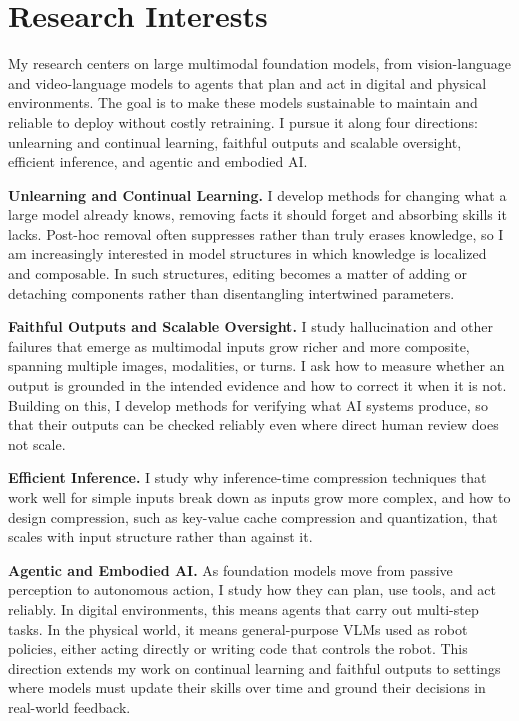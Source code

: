 \documentclass[letterpaper,11pt]{article}
\begin{document}
\section{Research Interests}

My research centers on large multimodal foundation models, from vision-language and video-language models to agents that plan and act in digital and physical environments. The goal is to make these models sustainable to maintain and reliable to deploy without costly retraining. I pursue it along four directions: unlearning and continual learning, faithful outputs and scalable oversight, efficient inference, and agentic and embodied AI.

\vspace{0.25cm}

\textbf{Unlearning and Continual Learning.}
I develop methods for changing what a large model already knows, removing facts it should forget and absorbing skills it lacks. Post-hoc removal often suppresses rather than truly erases knowledge, so I am increasingly interested in model structures in which knowledge is localized and composable. In such structures, editing becomes a matter of adding or detaching components rather than disentangling intertwined parameters.

\vspace{0.25cm}

\textbf{Faithful Outputs and Scalable Oversight.}
I study hallucination and other failures that emerge as multimodal inputs grow richer and more composite, spanning multiple images, modalities, or turns. I ask how to measure whether an output is grounded in the intended evidence and how to correct it when it is not. Building on this, I develop methods for verifying what AI systems produce, so that their outputs can be checked reliably even where direct human review does not scale.

\vspace{0.25cm}

\textbf{Efficient Inference.}
I study why inference-time compression techniques that work well for simple inputs break down as inputs grow more complex, and how to design compression, such as key-value cache compression and quantization, that scales with input structure rather than against it.

\vspace{0.25cm}

\textbf{Agentic and Embodied AI.}
As foundation models move from passive perception to autonomous action, I study how they can plan, use tools, and act reliably. In digital environments, this means agents that carry out multi-step tasks. In the physical world, it means general-purpose VLMs used as robot policies, either acting directly or writing code that controls the robot. This direction extends my work on continual learning and faithful outputs to settings where models must update their skills over time and ground their decisions in real-world feedback.
\end{document}
